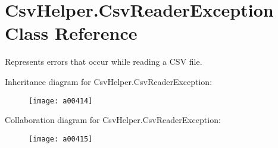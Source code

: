 \hypertarget{a00077}{\section{Csv\-Helper.\-Csv\-Reader\-Exception Class Reference}
\label{a00077}
}


Represents errors that occur while reading a C\-S\-V file.  




Inheritance diagram for Csv\-Helper.\-Csv\-Reader\-Exception\-:
\nopagebreak
\begin{figure}[H]
\begin{center}
\leavevmode
\texttt{[image: a00414]}
\end{center}
\end{figure}


Collaboration diagram for Csv\-Helper.\-Csv\-Reader\-Exception\-:
\nopagebreak
\begin{figure}[H]
\begin{center}
\leavevmode
\texttt{[image: a00415]}
\end{center}
\end{figure}
